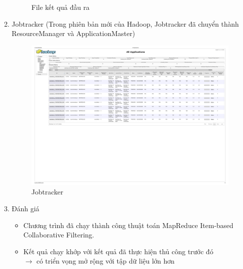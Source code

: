 \begin{enumerate}
\begin{figure}[ht]
              \caption{File kết quả đầu ra}
          \end{figure}
    \pagebreak
    \item Jobtracker (Trong phiên bản mới của Hadoop, Jobtracker đã chuyển thành ResourceManager và ApplicationMaster)
          \begin{figure}[ht]
              \centering
              \includegraphics[width=15cm]{images/ResourceManager.png}
              \caption{Jobtracker}
          \end{figure}
    \item Đánh giá
          \begin{itemize}
              \item Chương trình đã chạy thành công thuật toán MapReduce Item-based Collaborative Filtering.
              \item Kết quả chạy khớp với kết quả đã thực hiện thủ công trước đó \\ $\rightarrow$ có triển vọng mở rộng với tập dữ liệu lớn hơn
          \end{itemize}
\end{enumerate}
